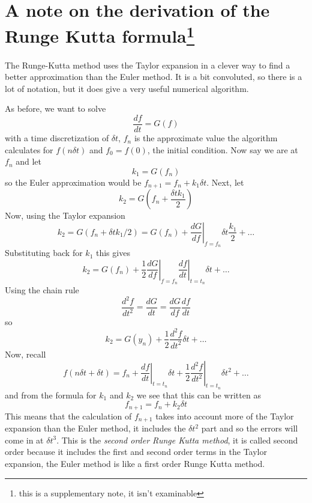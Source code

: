 \documentclass[12pt]{article}
\begin{document}
\section*{A note on the derivation of the Runge Kutta formula\footnote{this is a supplementary note, it isn't examinable}} 


The Runge-Kutta method uses the Taylor expansion in a clever way to
find a better approximation than the Euler method. It is a bit
convoluted, so there is a lot of notation, but it does give a very
useful numerical algorithm.

As before, we want to solve
\begin{equation}
\frac{df}{dt}=G(f)
\end{equation}
with a time discretization of $\delta t$, $f_n$ is the approximate
value the algorithm calculates for $f(n\delta t)$ and $f_0=f(0)$, the
initial condition. Now say we are at $f_n$ and let
\begin{equation}
k_1=G(f_n)
\end{equation}
so the Euler approximation would be $f_{n+1}=f_n+k_1\delta t$. Next, let
\begin{equation}
k_2=G\left(f_n+\frac{\delta t k_1}{2}\right)
\end{equation}
Now, using the Taylor expansion
\begin{equation}
k_2=G(f_n+\delta t k_1/2)=G(f_n)+\left.\frac{dG}{df}\right|_{f=f_n}\delta t\frac{k_1}{2}+\ldots
\end{equation}
Substituting back for $k_1$ this gives
\begin{equation}
k_2=G(f_n)+\frac{1}{2}\left.\frac{dG}{df}\right|_{f=f_n}\left.\frac{df}{dt}\right|_{t=t_n}\delta t+\ldots
\end{equation}
Using the chain rule
\begin{equation}
\frac{d^2f}{dt^2}=\frac{dG}{dt}=\frac{dG}{df}\frac{df}{dt}
\end{equation}
so
\begin{equation}
k_2=G(y_n)+\frac{1}{2}\frac{d^2f}{dt^2}\delta t+\ldots
\end{equation}
Now, recall
\begin{equation}
f(n\delta t + \delta t)=f_n+\left.\frac{df}{dt}\right|_{t=t_n}\delta t+\frac{1}{2}\left.\frac{d^2f}{dt^2}\right|_{t=t_n}\delta t^2+\ldots
\end{equation}
and from the formula for $k_1$ and $k_2$ we see that this can be written as
\begin{equation}
f_{n+1}=f_n+k_2\delta t
\end{equation}
This means that the calculation of $f_{n+1}$ takes into account
more of the Taylor expansion than the Euler method, it includes the
$\delta t^2$ part and so the errors will come in at $\delta t^3$.
This is the \textsl{second order Runge Kutta method}, it is called
second order because it includes the first and second order terms in
the Taylor expansion, the Euler method is like a first order Runge
Kutta method.
\end{document}
